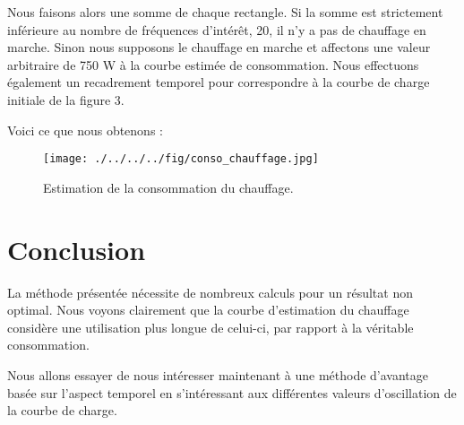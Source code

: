 \documentclass[10pt,a4paper]{article}
\begin{document}
Nous faisons alors une somme de chaque rectangle. Si la somme est strictement inférieure au nombre de fréquences d'intérêt, 20, il n'y a pas de chauffage en marche. Sinon nous supposons le chauffage en marche et affectons une valeur arbitraire de 750 W à la courbe estimée de consommation. Nous effectuons également un recadrement temporel pour correspondre à la courbe de charge initiale de la figure 3.

Voici ce que nous obtenons :

\begin{figure}[!h]
\begin{center}
\texttt{[image: ./../../../fig/conso\_chauffage.jpg]}
\caption{Estimation de la consommation du chauffage.}
\label{Figure}
\end{center}
\end{figure}

\section{Conclusion}
La méthode présentée nécessite de nombreux calculs pour un résultat non optimal. Nous voyons clairement que la courbe d'estimation du chauffage considère une utilisation plus longue de celui-ci, par rapport à la véritable consommation.

Nous allons essayer de nous intéresser maintenant à une méthode d'avantage basée sur l'aspect temporel en s'intéressant aux différentes valeurs d'oscillation de la courbe de charge.
\end{document}
